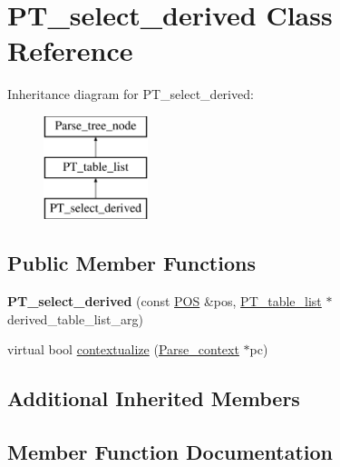 \hypertarget{classPT__select__derived}{}\section{P\+T\+\_\+select\+\_\+derived Class Reference}
\label{classPT__select__derived}
Inheritance diagram for P\+T\+\_\+select\+\_\+derived\+:\begin{figure}[H]
\begin{center}
\leavevmode
\includegraphics[height=3.000000cm]{classPT__select__derived}
\end{center}
\end{figure}
\subsection*{Public Member Functions}
\begin{DoxyCompactItemize}
\item 
\mbox{\label{classPT__select__derived_a37e84ae3e225b81f39f78e4c632b56d5}} 
{\bfseries P\+T\+\_\+select\+\_\+derived} (const \mbox{\hyperlink{structYYLTYPE}{P\+OS}} \&pos, \mbox{\hyperlink{classPT__table__list}{P\+T\+\_\+table\+\_\+list}} $\ast$derived\+\_\+table\+\_\+list\+\_\+arg)
\item 
virtual bool \mbox{\hyperlink{classPT__select__derived_a4a9ec94a1d6d7dd833e4be87271065fb}{contextualize}} (\mbox{\hyperlink{structParse__context}{Parse\+\_\+context}} $\ast$pc)
\end{DoxyCompactItemize}
\subsection*{Additional Inherited Members}


\subsection{Member Function Documentation}
\mbox{\label{classPT__select__derived_a4a9ec94a1d6d7dd833e4be87271065fb}} 
